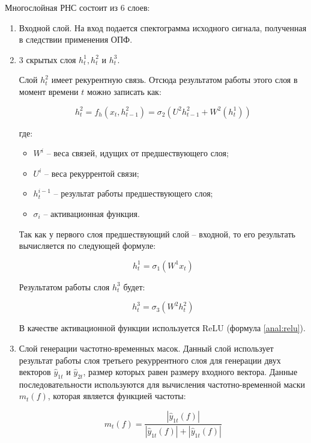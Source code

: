 Многослойная РНС состоит из 6 слоев:

\begin{enumerate}
	\item Входной слой. На вход подается спектограмма исходного сигнала, полученная в следствии применения ОПФ.
	\item 3 скрытых слоя $h_t^1, h_t^2$ и $h_t^3$. 
	
	Слой $h_t^2$ имеет рекурентную связь. Отсюда результатом работы этого слоя в момент времени $t$ можно записать как:
	
	\begin{equation}
	h_t^2 = f_h(x_t, h_{t-1}^2) = \sigma_2 (U^2 h_{t-1}^2 + W^2(h_{t}^1))
	\end{equation}
	
	где:
	
	\begin{itemize}
		\item $W^i$ -- веса связей, идущих от предшествующего слоя;
		\item $U^i$ -- веса рекуррентой связи;
		\item $h_t^{i-1}$ -- результат работы предшествующего слоя;
		\item $\sigma_i$ -- активационная функция.
	\end{itemize}

	Так как у первого слоя предшествующий слой -- входной, то его результать вычисляется по следующей формуле:
	
	\begin{equation}
	h_t^1 = \sigma_1 ( W^1 x_t)
	\end{equation}
	
	Результатом работы слоя $h_t^3$ будет:
	
	\begin{equation}
	h_t^3 = \sigma_3 (W^2 h_t^2)
	\end{equation}
	
	В качестве активационной функции используется ReLU (формула \ref{anal:relu}).
	
	\item Слой генерации частотно-временных масок. Данный слой использует результат работы слоя третьего рекуррентного слоя для генерации двух векторов $\hat{y}_{1t}$ и $\hat{y}_{2t}$, размер которых равен размеру входного вектора. Данные последовательности используются для вычисления частотно-временной маски $m_t(f)$, которая является функцией частоты:
	
	\begin{equation}
	m_t(f) = \frac{|\hat{y}_{1t}(f)|}{|\hat{y}_{1t}(f)| + |\hat{y}_{1t}(f)|}
	\label{des:mask}
	\end{equation}
	

\end{enumerate}
